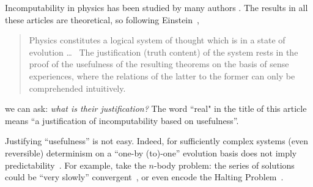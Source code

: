 \documentclass[l1pt]{elsarticle}
\begin{document}
{ Incomputability in physics has been studied by many authors \cite{svozil-qct,svozil-93,svozil-pac,10.1007/978-3-642-13962-8_31,dc-d91b,computanalisysphysics,Cooper2003, incomputfoundphysics,computable_universe,DBLP:books/daglib/p/Lloyd17, Cubitt:2015aa,PhysRevX.10.031038,moore,kanter,kreisel, wolfram85b,moore,svozil-2006-ran,PhysRevLett.119.240501,abbott2012strongrandomness, Abbott:2013ly,gisin_indet,aguero_trejo_new_2021,searching_kavulich_2021}. The results in all these articles are %
 theoretical, so following Einstein~\cite{EINSTEIN1936349},


\begin{quote}
Physics constitutes a logical system of thought which is in a state of evolution \dots \
The justification (truth content) of the system rests in the proof of the usefulness of the resulting theorems on the basis of sense experiences, where the relations of the latter to the former can only be comprehended intuitively.
\end{quote}

 we can ask: {\it what is their justification?} The word ``real" in the title of this article means ``a justification of incomputability based on usefulness''.

 Justifying ``usefulness'' is not easy. Indeed, for sufficiently complex systems (even reversible)
determinism on a ``one-by (to)-one'' evolution basis does not imply predictability~\cite{suppes-1993}. For example, take the $n$-body problem: the series of solutions~\cite{weierstrass-1885,poincare14,Sundman12,Wang91,Wang01} could be  ``very slowly'' convergent~\cite{Diacu96}, or even encode the Halting Problem~\cite{svozil-2007-cestial}.


}
\end{document}

